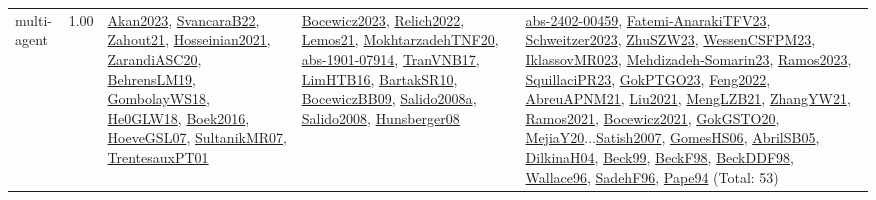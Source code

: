 {\begin{longtable}{p{3cm}r>{\raggedright\arraybackslash}p{6cm}>{\raggedright\arraybackslash}p{6cm}>{\raggedright\arraybackslash}p{8cm}}
\index{multi-agent}\index{Concepts!multi-agent}multi-agent &  1.00 & \hyperref[detail:Akan2023]{Akan2023}, \hyperref[detail:SvancaraB22]{SvancaraB22}, \hyperref[detail:Zahout21]{Zahout21}, \hyperref[detail:Hosseinian2021]{Hosseinian2021}, \hyperref[detail:ZarandiASC20]{ZarandiASC20}, \hyperref[detail:BehrensLM19]{BehrensLM19}, \hyperref[detail:GombolayWS18]{GombolayWS18}, \hyperref[detail:He0GLW18]{He0GLW18}, \hyperref[detail:Boek2016]{Boek2016}, \hyperref[detail:HoeveGSL07]{HoeveGSL07}, \hyperref[detail:SultanikMR07]{SultanikMR07}, \hyperref[detail:TrentesauxPT01]{TrentesauxPT01} & \hyperref[detail:Bocewicz2023]{Bocewicz2023}, \hyperref[detail:Relich2022]{Relich2022}, \hyperref[detail:Lemos21]{Lemos21}, \hyperref[detail:MokhtarzadehTNF20]{MokhtarzadehTNF20}, \hyperref[detail:abs-1901-07914]{abs-1901-07914}, \hyperref[detail:TranVNB17]{TranVNB17}, \hyperref[detail:LimHTB16]{LimHTB16}, \hyperref[detail:BartakSR10]{BartakSR10}, \hyperref[detail:BocewiczBB09]{BocewiczBB09}, \hyperref[detail:Salido2008a]{Salido2008a}, \hyperref[detail:Salido2008]{Salido2008}, \hyperref[detail:Hunsberger08]{Hunsberger08} & \hyperref[detail:abs-2402-00459]{abs-2402-00459}, \hyperref[detail:Fatemi-AnarakiTFV23]{Fatemi-AnarakiTFV23}, \hyperref[detail:Schweitzer2023]{Schweitzer2023}, \hyperref[detail:ZhuSZW23]{ZhuSZW23}, \hyperref[detail:WessenCSFPM23]{WessenCSFPM23}, \hyperref[detail:IklassovMR023]{IklassovMR023}, \hyperref[detail:Mehdizadeh-Somarin23]{Mehdizadeh-Somarin23}, \hyperref[detail:Ramos2023]{Ramos2023}, \hyperref[detail:SquillaciPR23]{SquillaciPR23}, \hyperref[detail:GokPTGO23]{GokPTGO23}, \hyperref[detail:Feng2022]{Feng2022}, \hyperref[detail:AbreuAPNM21]{AbreuAPNM21}, \hyperref[detail:Liu2021]{Liu2021}, \hyperref[detail:MengLZB21]{MengLZB21}, \hyperref[detail:ZhangYW21]{ZhangYW21}, \hyperref[detail:Ramos2021]{Ramos2021}, \hyperref[detail:Bocewicz2021]{Bocewicz2021}, \hyperref[detail:GokGSTO20]{GokGSTO20}, \hyperref[detail:MejiaY20]{MejiaY20}...\hyperref[detail:Satish2007]{Satish2007}, \hyperref[detail:GomesHS06]{GomesHS06}, \hyperref[detail:AbrilSB05]{AbrilSB05}, \hyperref[detail:DilkinaH04]{DilkinaH04}, \hyperref[detail:Beck99]{Beck99}, \hyperref[detail:BeckF98]{BeckF98}, \hyperref[detail:BeckDDF98]{BeckDDF98}, \hyperref[detail:Wallace96]{Wallace96}, \hyperref[detail:SadehF96]{SadehF96}, \hyperref[detail:Pape94]{Pape94} (Total: 53)\\

\end{longtable}}
